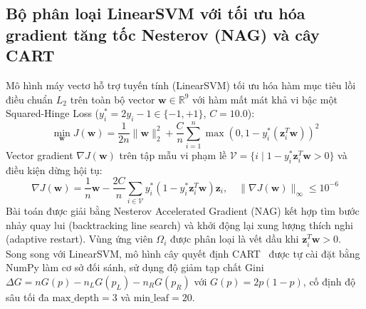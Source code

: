 \subsection{Bộ phân loại LinearSVM với tối ưu hóa gradient tăng tốc Nesterov (NAG) và cây CART}

Mô hình máy vectơ hỗ trợ tuyến tính (LinearSVM) tối ưu hóa hàm mục tiêu lồi điều chuẩn $L_2$ trên toàn bộ vector $\mathbf{w} \in \mathbb{R}^9$ với hàm mất mát khả vi bậc một Squared-Hinge Loss ($y_i^* = 2y_i - 1 \in \{-1, +1\}$, $C = 10.0$):
\begin{equation}
\min_{\mathbf{w}} J(\mathbf{w}) = \frac{1}{2n}\|\mathbf{w}\|_2^2 + \frac{C}{n}\sum_{i=1}^n \max\left(0, 1 - y_i^* (\mathbf{z}_i^T \mathbf{w})\right)^2
\label{eq:svm_objective}
\end{equation}
Vector gradient $\nabla J(\mathbf{w})$ trên tập mẫu vi phạm lề $\mathcal{V} = \{i \mid 1 - y_i^* \mathbf{z}_i^T \mathbf{w} > 0\}$ và điều kiện dừng hội tụ:
\begin{equation}
\nabla J(\mathbf{w}) = \frac{1}{n}\mathbf{w} - \frac{2C}{n}\sum_{i \in \mathcal{V}} y_i^* \left(1 - y_i^* \mathbf{z}_i^T \mathbf{w}\right)\mathbf{z}_i, \quad \|\nabla J(\mathbf{w})\|_\infty \le 10^{-6}
\label{eq:svm_gradient}
\end{equation}
Bài toán được giải bằng Nesterov Accelerated Gradient (NAG) kết hợp tìm bước nhảy quay lui (backtracking line search) và khởi động lại xung lượng thích nghi (adaptive restart). Vùng ứng viên $\Omega_i$ được phân loại là vết dầu khi $\mathbf{z}_i^T \mathbf{w} > 0$. Song song với LinearSVM, mô hình cây quyết định CART~\cite{breiman1984classification} được tự cài đặt bằng NumPy làm cơ sở đối sánh, sử dụng độ giảm tạp chất Gini $\Delta G = n G(p) - n_L G(p_L) - n_R G(p_R)$ với $G(p) = 2p(1-p)$, cố định độ sâu tối đa $\text{max\_depth} = 3$ và $\text{min\_leaf} = 20$.
